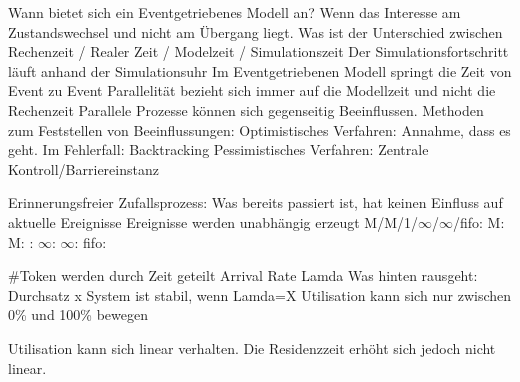 \documentclass[ngerman,a4paper,12pt]{scrreprt}
\begin{document}
\ul
	\li Wann bietet sich ein Eventgetriebenes Modell an? 
		\ul 
			\li Wenn das Interesse am Zustandswechsel und nicht am Übergang liegt. 
		\ulE
	\li Was ist der Unterschied zwischen Rechenzeit / Realer Zeit / Modelzeit / Simulationszeit
		\ul 
			\li Der Simulationsfortschritt läuft anhand der Simulationsuhr
			\li Im Eventgetriebenen Modell springt die Zeit von Event zu Event
			\li Parallelität bezieht sich immer auf die Modellzeit und nicht die Rechenzeit
		\ulE
	\li Parallele Prozesse können sich gegenseitig Beeinflussen. Methoden zum Feststellen von Beeinflussungen:
		\ul
			\li Optimistisches Verfahren: Annahme, dass es geht. Im Fehlerfall: Backtracking
			\li Pessimistisches Verfahren: Zentrale Kontroll/Barriereinstanz
		\ulE
\ulE



\ul
	\li Erinnerungsfreier Zufallsprozess: Was bereits passiert ist, hat keinen Einfluss auf aktuelle Ereignisse \ra Ereignisse werden unabhängig erzeugt
	\li M/M/1/$\infty$/$\infty$/fifo:
		\ul
			\li M:
			\li M:
			:
			\li $\infty$:
			\li $\infty$:
			\li fifo: 
		\ulE
\ulE

\ul
	\li \#Token werden durch Zeit geteilt \ra Arrival Rate Lamda
	\li Was hinten rausgeht: Durchsatz x
	\li System ist stabil, wenn Lamda=X
	\li Utilisation kann sich nur zwischen 0\% und 100\% bewegen
\ulE
{}

\ul
	\li Utilisation kann sich linear verhalten. 
	\li Die Residenzzeit erhöht sich jedoch nicht linear.
\ulE
{}


\end{document}
